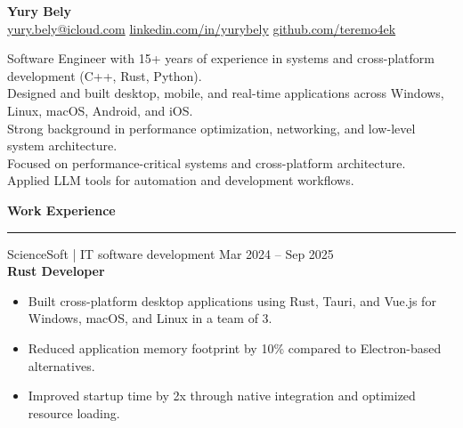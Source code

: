 \documentclass[10pt, a4paper]{article}
\newcommand{\heading}[1]{%
    \vspace{4pt}%
    \begin{center}{\color{accent}\large\bfseries #1}\end{center}%
    \vspace{-8pt}%
    \textcolor{accent}{\rule{\textwidth}{0.4pt}}%
    \vspace{4pt}%
}
\newcommand{\roleentry}[3]{%
    \vspace{8pt}%
    {\normalsize #1 \hfill {\small\color{graytext}#3}}\\[1pt]%
    {\textbf{#2}}%
    \vspace{1pt}%
}
\begin{document}
\begin{center}
    {\color{accent}\LARGE\bfseries Yury Bely}\\[8pt]
    {\small
    \href{mailto:yury.bely@icloud.com}{yury.bely@icloud.com}
    \enspace\color{graytext}\textbullet\color{black}\enspace
    \href{https://linkedin.com/in/yurybely}{linkedin.com/in/yurybely}
    \enspace\color{graytext}\textbullet\color{black}\enspace
    \href{https://github.com/teremo4ek}{github.com/teremo4ek}}
\end{center}

\vspace{4pt}

\noindent\color{graytext}\small
Software Engineer with 15+ years of experience in systems and cross-platform development (C++, Rust, Python).\\
Designed and built desktop, mobile, and real-time applications across Windows, Linux, macOS, Android, and iOS.\\
Strong background in performance optimization, networking, and low-level system architecture.\\
Focused on performance-critical systems and cross-platform architecture.\\
Applied LLM tools for automation and development workflows.

\heading{Work Experience}

\roleentry{ScienceSoft | IT software development}{Rust Developer}{Mar 2024 -- Sep 2025}
\begin{itemize}
    \item Built cross-platform desktop applications using Rust, Tauri, and Vue.js for Windows, macOS, and Linux in a team of 3.
    \item Reduced application memory footprint by 10\% compared to Electron-based alternatives.
    \item Improved startup time by 2x through native integration and optimized resource loading.
\end{itemize}
\end{document}
